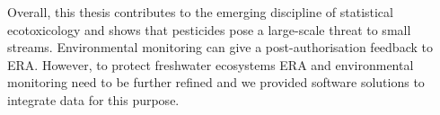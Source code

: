 Overall, this thesis contributes to the emerging discipline of statistical ecotoxicology and shows that pesticides pose a large-scale threat to small streams.
Environmental monitoring can give a post-authorisation feedback to ERA.
However, to protect freshwater ecosystems ERA and environmental monitoring need to be further refined and we provided software solutions to integrate data for this purpose.



\endgroup 
 
